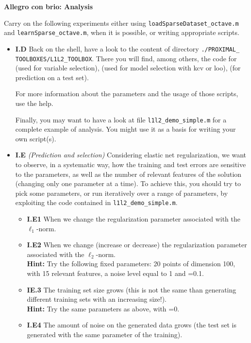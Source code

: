 \documentclass[DIN, pagenumber=false, fontsize=11pt, parskip=half]{scrartcl}
\newcommand{\mysection}[1]{\noindent\large\textbf{#1}}
\begin{document}
\mysection{Allegro con brio: Analysis}

Carry on the following experiments either using \texttt{loadSparseDataset\_octave.m} and \texttt{learnSparse\_octave.m}, when it is possible, or writing appropriate scripts.

\begin{itemize}
	
	
	\item \textbf{I.D} 	Back on the shell, have a look to the content of directory \texttt{./PROXIMAL\_} \texttt{TOOLBOXES/L1L2\_TOOLBOX}. 
	There you will find, among others, the code for   (used for variable selection),  (used for model selection with kcv or loo),  (for prediction on a test set).

For more information about the parameters and the usage of those scripts, use the help.
	
	
Finally, you may want to have a look at file \texttt{l1l2\_demo\_simple.m} for a complete example of analysis.
You might use it as a basis for writing your own script(s).

	\item \textbf{I.E} \emph{(Prediction and selection)}
	Considering elastic net regularization, we want to observe, in a systematic way, how the training and test errors are sensitive to the parameters, as well as the number of relevant features of the solution (changing only one parameter at a time).
	To achieve this, you should try to pick some parameters, or run iteratively over a range of parameters, by exploiting the code contained in \texttt{l1l2\_demo\_simple.m}.

\begin{itemize}
  \item \textbf{I.E1} When we change the  regularization parameter  associated with the $\ell_1$-norm.
  \item \textbf{I.E2} When we change (increase or decrease) the regularization parameter  associated with the $\ell_2$-norm.\\
  \textbf{Hint:} Try the following fixed parameters: 20 points of dimension 100, with 15 relevant features, a noise level equal to 1 and =0.1.
  \item \textbf{IE.3} The training set size grows (this is not the same than generating different training sets with an increasing size!).\\
  \textbf{Hint:} Try the same parameters as above, with =0. 
  \item \textbf{I.E4} The amount of noise on the generated data grows (the test set is generated with the same parameter of the training).
\end{itemize}



\end{itemize}
\end{document}
